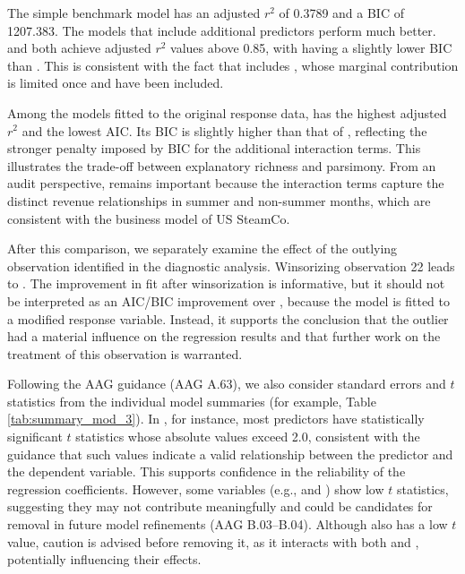 The simple benchmark model  has an adjusted $r^2$ of 0.3789 and a BIC of 1207.383. The models that include additional predictors perform much better.  and  both achieve adjusted $r^2$ values above 0.85, with  having a slightly lower BIC than . This is consistent with the fact that  includes , whose marginal contribution is limited once  and  have been included.

Among the models fitted to the original response data,  has the highest adjusted $r^2$ and the lowest AIC. Its BIC is slightly higher than that of , reflecting the stronger penalty imposed by BIC for the additional interaction terms. This illustrates the trade-off between explanatory richness and parsimony. From an audit perspective,  remains important because the interaction terms capture the distinct revenue relationships in summer and non-summer months, which are consistent with the business model of US SteamCo.

After this comparison, we separately examine the effect of the outlying observation identified in the diagnostic analysis. Winsorizing observation 22 leads to . The improvement in fit after winsorization is in\-for\-mative, but it should not be interpreted as an AIC/BIC improvement over , because the model is fitted to a modified response variable. Instead, it supports the conclusion that the outlier had a material influence on the regression results and that further work on the treatment of this observation is warranted.

Following the AAG guidance (AAG A.63), we also consider standard errors and $t$ statistics from the individual model summaries (for example, Table \ref{tab:summary_mod_3}). 
In , for instance, most predictors have statistically significant $t$ statistics whose absolute values exceed 2.0, consistent with the guidance that such values indicate a valid relationship between the predictor and the dependent variable. 
This supports confidence in the reliability of the regression coefficients. 
However, some variables (e.g.,  and ) show low $t$ statistics, suggesting they may not contribute meaningfully and could be candidates for removal in future model refinements (AAG B.03–B.04). 
Although  also has a low $t$ value, caution is advised before removing it, as it interacts with both  and , potentially influencing their effects.

